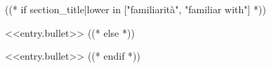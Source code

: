 ((* if section_title|lower in ["familiarità", "familiar with"] *))
\item[] <<entry.bullet>>
((* else *))
\item <<entry.bullet>>
((* endif *))
